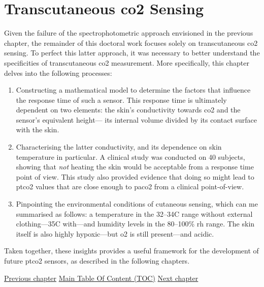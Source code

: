 \chapter{Transcutaneous \texorpdfstring{\gls{co2}}{CO2} Sensing}\label{chap:tcco2}

\begin{tldrbox}
	
	Given the failure of the spectrophotometric approach envisioned in the previous chapter, the remainder of this doctoral work focuses solely on transcutaneous \gls{co2} sensing. To perfect this latter approach, it was necessary to better understand the specificities of transcutaneous \gls{co2} measurement. More specifically, this chapter delves into the following processes:
	\begin{enumerate}
		\item Constructing a mathematical model to determine the factors that influence the response time of such a sensor. This response time is ultimately dependent on two elements: the skin's conductivity towards \gls{co2} and the sensor's equivalent height---\ie{} its internal volume divided by its contact surface with the skin.
		\item Characterising the latter conductivity, and its dependence on skin temperature in particular. A clinical study was conducted on 40 subjects, showing that \emph{not} heating the skin would be acceptable from a response time point of view. This study also provided evidence that doing so might lead to \gls{ptco2} values that are close enough to \gls{paco2} from a clinical point-of-view.
		\item Pinpointing the environmental conditions of cutaneous sensing, which can me summarised as follows: a temperature in the 32--34{\degree}C range without external clothing---35{\degree}C with---and humidity levels in the 80--100\% \gls{rh} range. The skin itself is also highly hypoxic---but \gls{o2} is still present---and acidic.
	\end{enumerate}
	
	Taken together, these insights provides a useful framework for the development of future \gls{ptco2} sensors, as described in the following chapters.
	
	\tcblower
	
	\hyperref[chap:co2hb]{Previous chapter} \hfill \hyperref[chapter:toc]{Main Table Of Content (TOC)} \hfill \hyperref[chap:choosing_techno]{Next chapter}
	
\end{tldrbox}

